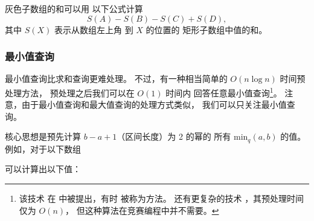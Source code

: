 灰色子数组的和可以用
以下公式计算
\[S(A) - S(B) - S(C) + S(D),\]
其中 $S(X)$ 表示从数组左上角
到 $X$ 的位置的
矩形子数组中值的和。

\subsubsection{最小值查询}


最小值查询比求和查询更难处理。
不过，有一种相当简单的
$O(n \log n)$ 时间预处理方法，
预处理之后我们可以在 $O(1)$ 时间内
回答任意最小值查询\footnote{该技术
在 \cite{ben00} 中被提出，有时
被称为方法。
还有更复杂的技术 \cite{fis06}，其预处理时间仅为 $O(n)$，
但这种算法在竞赛编程中并不需要。}。
注意，由于最小值查询和最大值查询的处理方式类似，
我们可以只关注最小值查询。

核心思想是预先计算
$b-a+1$（区间长度）为 2 的幂的
所有 $\textrm{min}_q(a,b)$ 的值。
例如，对于以下数组

\begin{center}
\end{center}
可以计算出以下值：

